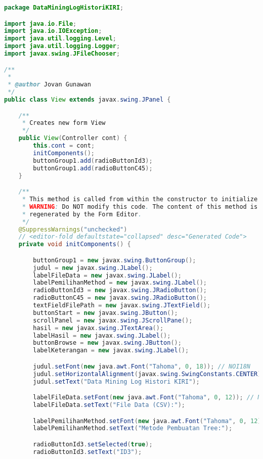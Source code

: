 \begin{lstlisting}[language=Java,basicstyle=\tiny,caption=View.java]
package DataMiningLogHistoriKIRI;

import java.io.File;
import java.io.IOException;
import java.util.logging.Level;
import java.util.logging.Logger;
import javax.swing.JFileChooser;

/**
 *
 * @author Jovan Gunawan
 */
public class View extends javax.swing.JPanel {

    /**
     * Creates new form View
     */
    public View(Controller cont) {
        this.cont = cont;
        initComponents();
        buttonGroup1.add(radioButtonId3);
        buttonGroup1.add(radioButtonC45);
    }

    /**
     * This method is called from within the constructor to initialize the form.
     * WARNING: Do NOT modify this code. The content of this method is always
     * regenerated by the Form Editor.
     */
    @SuppressWarnings("unchecked")
    // <editor-fold defaultstate="collapsed" desc="Generated Code">                          
    private void initComponents() {

        buttonGroup1 = new javax.swing.ButtonGroup();
        judul = new javax.swing.JLabel();
        labelFileData = new javax.swing.JLabel();
        labelPemilihanMethod = new javax.swing.JLabel();
        radioButtonId3 = new javax.swing.JRadioButton();
        radioButtonC45 = new javax.swing.JRadioButton();
        textFieldFilePath = new javax.swing.JTextField();
        buttonStart = new javax.swing.JButton();
        scrollPanel = new javax.swing.JScrollPane();
        hasil = new javax.swing.JTextArea();
        labelHasil = new javax.swing.JLabel();
        buttonBrowse = new javax.swing.JButton();
        labelKeterangan = new javax.swing.JLabel();

        judul.setFont(new java.awt.Font("Tahoma", 0, 18)); // NOI18N
        judul.setHorizontalAlignment(javax.swing.SwingConstants.CENTER);
        judul.setText("Data Mining Log Histori KIRI");

        labelFileData.setFont(new java.awt.Font("Tahoma", 0, 12)); // NOI18N
        labelFileData.setText("File Data (CSV):");

        labelPemilihanMethod.setFont(new java.awt.Font("Tahoma", 0, 12)); // NOI18N
        labelPemilihanMethod.setText("Metode Pembuatan Tree:");

        radioButtonId3.setSelected(true);
        radioButtonId3.setText("ID3");


\end{lstlisting}
